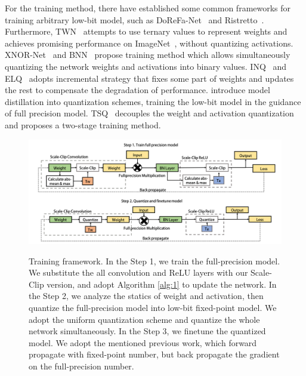 \documentclass[letterpaper]{article} %
\begin{document}
For the training method, there have established some common frameworks for training arbitrary low-bit model, 
such as DoReFa-Net~\cite{zhou2016dorefa} and Ristretto~\cite{gysel2016ristretto}. 
Furthermore, TWN~\cite{zhu2016trained} attempts to use ternary values to represent weights and achieves promising performance on ImageNet~\cite{deng2009imagenet}, without quantizing activations. XNOR-Net~\cite{rastegari2016xnor} and BNN~\cite{courbariaux2016binarized} propose training method which allows simultaneously quantizing the network weights and activations into binary values.
INQ~\cite{zhou2017incremental} and ELQ~\cite{zhou2018explicit} adopts incremental strategy that fixes some part of weights and updates the rest to compensate the degradation of performance.  
\cite{mishra2017apprentice,polino2018model} introduce model distillation into quantization schemes, training the low-bit model in the guidance of full precision model.
TSQ~\cite{wang2018two} decouples the weight and activation quantization and proposes a two-stage training method.
\begin{figure}[ht!]
	\includegraphics[width=1.0\textwidth]{quantization_framework.png}\label{training-quantization-framework}
	\caption{Training framework. In the Step 1, we train the full-precision model. We substitute the all convolution and ReLU layers with our Scale-Clip version, and adopt Algorithm \ref{alg:1} to update the network. In the Step 2, we analyze the statics of weight and activation, then quantize the full-precision model into low-bit fixed-point model. We adopt the uniform quantization scheme and quantize the whole network simultaneously. In the Step 3, we finetune the quantized model. We adopt the mentioned previous work, which forward propagate with fixed-point number, but back propagate the gradient on the full-precision number.}
\end{figure}
\end{document}
